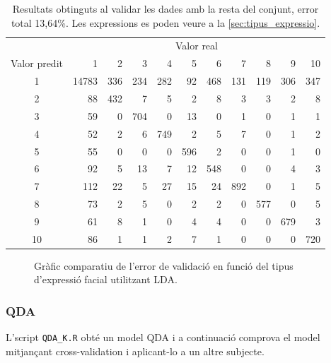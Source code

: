 \documentclass[a4paper]{article}
\begin{document}
\begin{table}[H]
	\centering
	\def\arraystretch{1.2}
	\begin{tabular}{|c|rrrrrrrrrr|}
		\hline
		& \multicolumn{10}{c|}{Valor real} \\
		Valor predit & 1 & 2 & 3 & 4 & 5 & 6 & 7 & 8 & 9 & 10 \\
		\hline
		1 & 14783 & 336 & 234 & 282 & 92 & 468 & 131 & 119 & 306 & 347 \\
		2 & 88 & 432 & 7 & 5 & 2 & 8 & 3 & 3 & 2 & 8 \\
		3 & 59 & 0 & 704 & 0 & 13 & 0 & 1 & 0 & 1 & 1 \\
		4 & 52 & 2 & 6 & 749 & 2 & 5 & 7 & 0 & 1 & 2 \\
		5 & 55 & 0 & 0 & 0 & 596 & 2 & 0 & 0 & 1 & 0 \\
		6 & 92 & 5 & 13 & 7 & 12 & 548 & 0 & 0 & 4 & 3 \\
		7 & 112 & 22 & 5 & 27 & 15 & 24 & 892 & 0 & 1 & 5 \\
		8 & 73 & 2 & 5 & 0 & 2 & 2 & 0 & 577 & 0 & 5 \\
		9 & 61 & 8 & 1 & 0 & 4 & 4 & 0 & 0 & 679 & 3 \\
		10 & 86 & 1 & 1 & 2 & 7 & 1 & 0 & 0 & 0 & 720 \\
		\hline
	\end{tabular}
	\captionsetup{width=0.8\textwidth}
	\caption{Resultats obtinguts al validar les dades amb la resta del conjunt, error total 13,64\%. Les expressions es poden veure a la \autoref{sec:tipus_expressio}.}
\end{table}

\begin{figure}[H]
	\centering
	\captionsetup{width=0.8\textwidth}
	\caption{Gràfic comparatiu de l'error de validació en funció del tipus d'expressió facial utilitzant LDA.}
\end{figure}

\subsubsection{QDA}
L’script \verb|QDA_K.R|  obté un model QDA i a continuació comprova el model mitjançant cross-validation i aplicant-lo a un altre subjecte.
\end{document}

